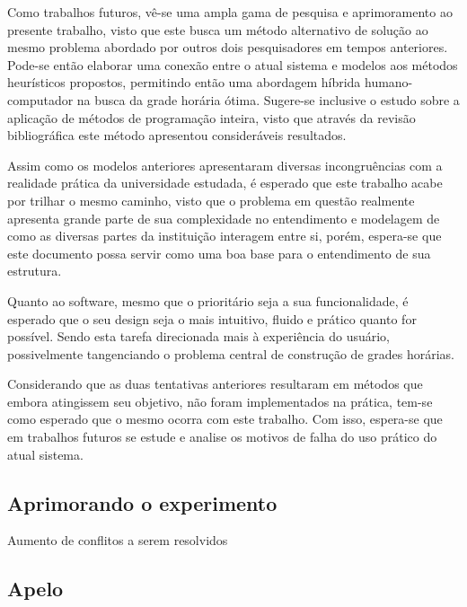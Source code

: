 Como trabalhos futuros, vê-se uma ampla gama de pesquisa e aprimoramento ao presente trabalho, visto que este busca um método alternativo de solução ao mesmo problema abordado por outros dois pesquisadores em tempos anteriores. Pode-se então elaborar uma conexão entre o atual sistema e modelos aos métodos heurísticos propostos, permitindo então uma abordagem híbrida humano-computador na busca da grade horária ótima. Sugere-se inclusive o estudo sobre a aplicação de métodos de programação inteira, visto que através da revisão bibliográfica este método apresentou consideráveis resultados.

Assim como os modelos anteriores apresentaram diversas incongruências com a realidade prática da universidade estudada, é esperado que este trabalho acabe por trilhar o mesmo caminho, visto que o problema em questão realmente apresenta grande parte de sua complexidade no entendimento e modelagem de como as diversas partes da instituição interagem entre si, porém, espera-se que este documento possa servir como uma boa base para o entendimento de sua estrutura.

Quanto ao software, mesmo que o prioritário seja a sua funcionalidade, é esperado que o seu design seja o mais intuitivo, fluido e prático quanto for possível. Sendo esta tarefa direcionada mais à experiência do usuário, possivelmente tangenciando o problema central de construção de grades horárias.

Considerando que as duas tentativas anteriores resultaram em métodos que embora atingissem seu objetivo, não foram implementados na prática, tem-se como esperado que o mesmo ocorra com este trabalho. Com isso, espera-se que em trabalhos futuros se estude e analise os motivos de falha do uso prático do atual sistema.



\subsection{Aprimorando o experimento}


Aumento de conflitos a serem resolvidos

\subsection*{Apelo}

